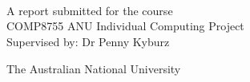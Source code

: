 \begin{titlepage}
  \enlargethispage{2cm}
  \begin{center}
    \makeatletter
    \Huge\textbf{\@title} \\[.4cm]
    \Huge\textbf{\thesisqualifier} \\[2.5cm]
    \huge\textbf{\@author} \\[9cm]
    \makeatother
    \LARGE A report submitted for the course \\
    COMP8755 ANU Individual Computing Project \\
    Supervised by: Dr Penny Kyburz
    
    The Australian National University \\[2cm]
    \thismonth

    \vspace*{\fill}
    \makeatletter
        {\selectfont\textcopyright}\ \@author{} \number\year
        \makeatother
    
  \end{center}
\end{titlepage}
